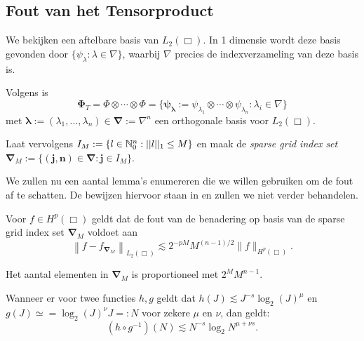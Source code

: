 \subsection{Fout van het Tensorproduct}
We bekijken een aftelbare basis van $L_2(\Box)$. In 1 dimensie wordt deze basis gevonden door $\{ \psi_\lambda: \lambda \in \nabla \}$, waarbij $\nabla$ precies de indexverzameling van deze basis is.

Volgens \cite[L3.1.7]{tammo} is 
\[ 
  \boldsymbol\Phi_T = \Phi \otimes \cdots \otimes \Phi = \{ \boldsymbol{\psi_\lambda} := \psi_{\lambda_1} \otimes \cdots \otimes \psi_{\lambda_n}: \lambda_i \in \nabla \}
\]
met $\boldsymbol\lambda := (\lambda_1, \ldots, \lambda_n) \in \boldsymbol{\nabla} := \nabla^n$ een orthogonale basis voor $L_2(\Box)$.

Laat vervolgens $I_M := \{ l \in \mathbb{N}^n_0: ||l||_1 \leq M \}$ en maak de \emph{sparse grid index set} $\boldsymbol{\nabla}_M := \{ \boldsymbol{(j,n)} \in \boldsymbol{\nabla}: \boldsymbol{j} \in I_M \}$.

We zullen nu een aantal lemma's enumereren die we willen gebruiken om de fout af te schatten. De bewijzen hiervoor
staan in \cite{tammo} en zullen we niet verder behandelen.
\begin{lemm}{\cite[P3.2.3]{tammo}}
  \label{en_daarom_jongens_en_meisjes}
  Voor $f \in H^p(\Box)$ geldt dat de fout van de benadering op basis van de sparse grid index set $\boldsymbol{\nabla}_M$ voldoet aan
  \[
  \left\| f - f_{\boldsymbol\nabla_M} \right\|_{L_2(\Box)} \lesssim 2^{-pM} M^{(n-1)/2} \| f \|_{H^p(\Box)}.
  \]
\end{lemm}
\begin{lemm}{\cite[L3.3.1]{tammo}}
  \label{gebruiken_we_referenties}
  Het aantal elementen in $\boldsymbol{\nabla}_M$ is proportioneel met $2^M M^{n-1}$.
\end{lemm}
\begin{lemm}{\cite[L3.4.1]{tammo}}
  \label{want_dit_werkt_goed_zo}
  Wanneer er voor twee functies $h, g$ geldt dat $h(J) \lesssim J^{-s}\log_2(J)^\mu$ en $g(J) \simeq= \log_2(J)^\nu J =: N$ voor zekere $\mu$ en $\nu$, dan geldt:
  \[
  (h \circ g^{-1})(N) \lesssim N^{-s} \log_2{N}^{\mu + \nu s}.
  \]
\end{lemm}

